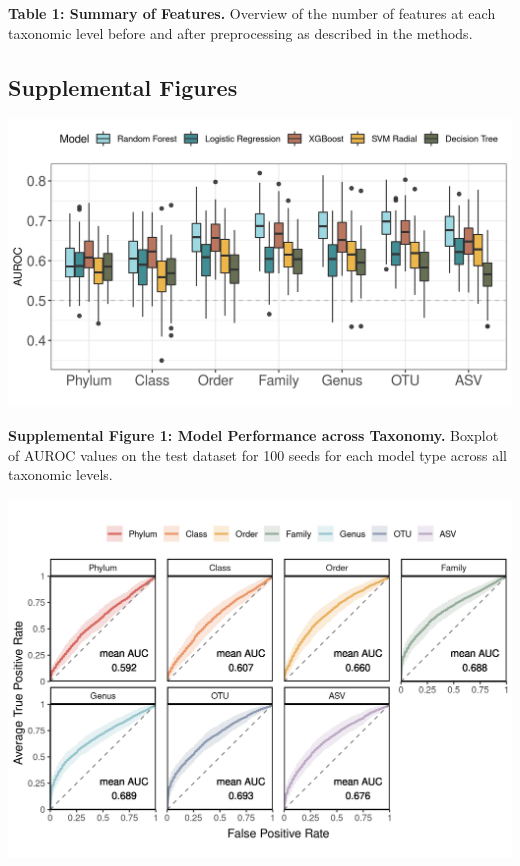 \documentclass[
]{article}
\begin{document}
\textbf{Table 1: Summary of Features.} Overview of the number of
features at each taxonomic level before and after preprocessing as
described in the methods.

\newpage

\hypertarget{supplemental-figures}{%
\subsection{Supplemental Figures}\label{supplemental-figures}}

\includegraphics{figure_s1.png}

\textbf{Supplemental Figure 1: Model Performance across Taxonomy.}
Boxplot of AUROC values on the test dataset for 100 seeds for each model
type across all taxonomic levels.

\newpage

\includegraphics[width=\textwidth,height=0.5\textheight]{figure_s2.png}
\end{document}
